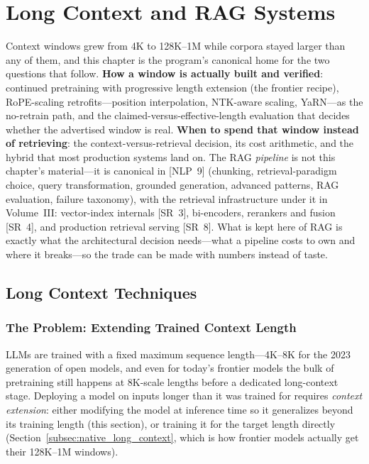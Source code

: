 \chapter{Long Context and RAG Systems}
\label{chap:long_context_rag}

\begin{tldr}
Context windows grew from 4K to 128K--1M while corpora stayed larger than any of them, and this chapter is the program's canonical home for the two questions that follow. \textbf{How a window is actually built and verified}: continued pretraining with progressive length extension (the frontier recipe), RoPE-scaling retrofits---position interpolation, NTK-aware scaling, YaRN---as the no-retrain path, and the claimed-versus-effective-length evaluation that decides whether the advertised window is real. \textbf{When to spend that window instead of retrieving}: the context-versus-retrieval decision, its cost arithmetic, and the hybrid that most production systems land on. The RAG \emph{pipeline} is not this chapter's material---it is canonical in [NLP~9] (chunking, retrieval-paradigm choice, query transformation, grounded generation, advanced patterns, RAG evaluation, failure taxonomy), with the retrieval infrastructure under it in Volume~III: vector-index internals [SR~3], bi-encoders, rerankers and fusion [SR~4], and production retrieval serving [SR~8]. What is kept here of RAG is exactly what the architectural decision needs---what a pipeline costs to own and where it breaks---so the trade can be made with numbers instead of taste.
\end{tldr}

\section{Long Context Techniques}
\label{sec:long_context}

\subsection{The Problem: Extending Trained Context Length}

LLMs are trained with a fixed maximum sequence length---4K--8K for the 2023 generation of open models, and even for today's frontier models the bulk of pretraining still happens at 8K-scale lengths before a dedicated long-context stage. Deploying a model on inputs longer than it was trained for requires \textit{context extension}: either modifying the model at inference time so it generalizes beyond its training length (this section), or training it for the target length directly (Section~\ref{subsec:native_long_context}, which is how frontier models actually get their 128K--1M windows).

